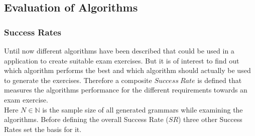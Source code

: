 \begin{testexample}
\begin{minipage}{6in}
{
		}
	\end{minipage}
	\label{IllustrationAlgorithmSplitAndFillPart6}
	
\end{testexample}







\noindent
\begin{figure} [h]
	
\end{figure}

\clearpage
\pagebreak
\subsection{Evaluation of Algorithms} \label{AnalysisOfAlgorithms}
\subsubsection{Success Rates} \label{successRates}
\noindent Until now different algorithms have been described that could be used in a application to create suitable exam exercises. But it is of interest to find out which algorithm performs the best and which algorithm should actually be used to generate the exercises. Therefore a composite $Success~Rate$ is defined that measures the algorithms performance for the different requirements towards an exam exercise.  \\

\noindent Here $N \in  \mathbb{N}$ is the sample size of all generated grammars while examining the algorithms. Before defining the overall Success Rate ($SR$) three other Success Rates set the basis for it.\\

